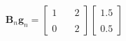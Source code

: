 \documentclass[preview]{standalone}
\begin{document}
\begin{align*}
\mathbf{B}_n \mathbf{g}_n = \begin{bmatrix} 1 & \quad 2 \\ \\0 & \quad 2 \end{bmatrix}\begin{bmatrix} 1.5 \\ \\ 0.5 \end{bmatrix}
\end{align*}
\end{document}
